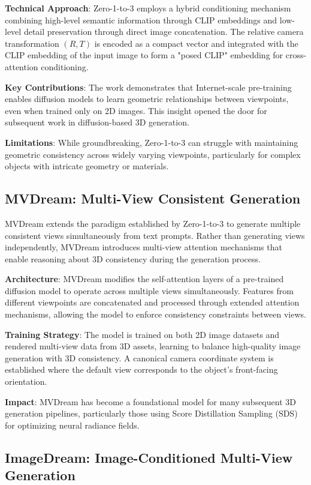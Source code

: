 \textbf{Technical Approach}: Zero-1-to-3 employs a hybrid conditioning mechanism combining high-level semantic information through CLIP embeddings and low-level detail preservation through direct image concatenation. The relative camera transformation $(R, T)$ is encoded as a compact vector and integrated with the CLIP embedding of the input image to form a "posed CLIP" embedding for cross-attention conditioning.

\textbf{Key Contributions}: The work demonstrates that Internet-scale pre-training enables diffusion models to learn geometric relationships between viewpoints, even when trained only on 2D images. This insight opened the door for subsequent work in diffusion-based 3D generation.

\textbf{Limitations}: While groundbreaking, Zero-1-to-3 can struggle with maintaining geometric consistency across widely varying viewpoints, particularly for complex objects with intricate geometry or materials.

\subsection{MVDream: Multi-View Consistent Generation}

MVDream extends the paradigm established by Zero-1-to-3 to generate multiple consistent views simultaneously from text prompts. Rather than generating views independently, MVDream introduces multi-view attention mechanisms that enable reasoning about 3D consistency during the generation process.

\textbf{Architecture}: MVDream modifies the self-attention layers of a pre-trained diffusion model to operate across multiple views simultaneously. Features from different viewpoints are concatenated and processed through extended attention mechanisms, allowing the model to enforce consistency constraints between views.

\textbf{Training Strategy}: The model is trained on both 2D image datasets and rendered multi-view data from 3D assets, learning to balance high-quality image generation with 3D consistency. A canonical camera coordinate system is established where the default view corresponds to the object's front-facing orientation.

\textbf{Impact}: MVDream has become a foundational model for many subsequent 3D generation pipelines, particularly those using Score Distillation Sampling (SDS) for optimizing neural radiance fields.

\subsection{ImageDream: Image-Conditioned Multi-View Generation}


